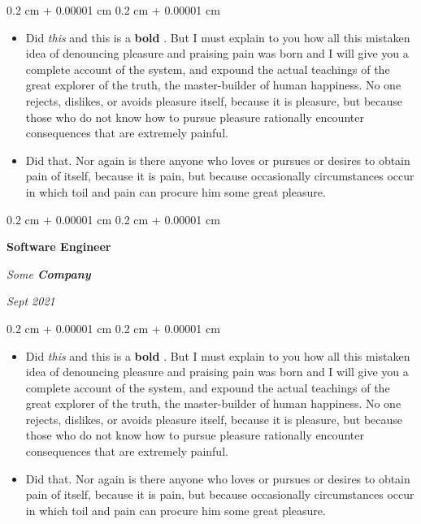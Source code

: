 \documentclass[10pt, letterpaper]{article}
\newenvironment{highlights}{
    \begin{itemize}[
        topsep=0.10 cm,
        parsep=0.10 cm,
        partopsep=0pt,
        itemsep=0pt,
        leftmargin=0.4 cm + 10pt
    ]
}{
    \end{itemize}
} %
\newenvironment{onecolentry}{
    \begin{adjustwidth}{
        0.2 cm + 0.00001 cm
    }{
        0.2 cm + 0.00001 cm
    }
}{
    \end{adjustwidth}
} %
\newenvironment{twocolentry}[2][]{
    \onecolentry
    \def\secondColumn{#2}
    \setcolumnwidth{\fill, 4.5 cm}
    \begin{paracol}{2}
}{
    \switchcolumn \raggedleft \secondColumn
    \end{paracol}
    \endonecolentry
} %
\let\hrefWithoutArrow\href
\renewcommand{\href}[2]{\hrefWithoutArrow{#1}{\ifthenelse{\equal{#2}{}}{ }{#2 }\raisebox{.15ex}{\footnotesize \faExternalLink*}}}
\begin{document}
        \vspace{0.10 cm}
        \begin{onecolentry}
            \begin{highlights}
                \item Did \textit{this} and this is a \textbf{bold} \href{https://example.com}{link}. But I must explain to you how all this mistaken idea of denouncing pleasure and praising pain was born and I will give you a complete account of the system, and expound the actual teachings of the great explorer of the truth, the master-builder of human happiness. No one rejects, dislikes, or avoids pleasure itself, because it is pleasure, but because those who do not know how to pursue pleasure rationally encounter consequences that are extremely painful.
                \item Did that. Nor again is there anyone who loves or pursues or desires to obtain pain of itself, because it is pain, but because occasionally circumstances occur in which toil and pain can procure him some great pleasure.
            \end{highlights}
        \end{onecolentry}


        \vspace{0.2 cm}

            \begin{twocolentry}{


        \textit{Sept 2021}    }
                \textbf{Software Engineer}

                \textit{Some \textbf{Company}}
            \end{twocolentry}

        \vspace{0.10 cm}
        \begin{onecolentry}
            \begin{highlights}
                \item Did \textit{this} and this is a \textbf{bold} \href{https://example.com}{link}. But I must explain to you how all this mistaken idea of denouncing pleasure and praising pain was born and I will give you a complete account of the system, and expound the actual teachings of the great explorer of the truth, the master-builder of human happiness. No one rejects, dislikes, or avoids pleasure itself, because it is pleasure, but because those who do not know how to pursue pleasure rationally encounter consequences that are extremely painful.
                \item Did that. Nor again is there anyone who loves or pursues or desires to obtain pain of itself, because it is pain, but because occasionally circumstances occur in which toil and pain can procure him some great pleasure.
            \end{highlights}
        \end{onecolentry}
\end{document}
